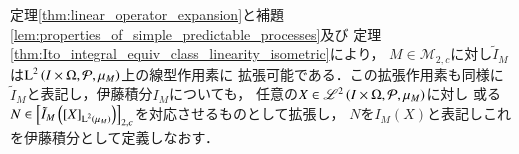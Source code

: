 	\begin{screen}
		\begin{thm}[伊藤積分の拡張]
			定理\ref{thm:linear_operator_expansion}と補題\ref{lem:properties_of_simple_predictable_processes}及び
			定理\ref{thm:Ito_integral_equiv_class_linearity_isometric}により，
			$M \in \mathcal{M}_{2,c}$に対し$\tilde{I}_M$は$\operatorname{L}^{2} \left(I \times \Omega,\mathcal{P},\mu_M\right)$上の線型作用素に
			拡張可能である．この拡張作用素も同様に$\tilde{I}_M$と表記し，伊藤積分$I_M$についても，
			任意の$X \in \mathscr{L}^{2} \left(I \times \Omega,\mathcal{P},\mu_M\right)$に対し
			或る$N \in \left[\tilde{I}_M\left( \left[X\right]_{\operatorname{L}^{2} \left(\mu_M\right)} \right)\right]_{2,c}$を対応させるものとして拡張し，
			$N$を$I_M(X)$と表記しこれを伊藤積分として定義しなおす．
		\end{thm}
	\end{screen}
